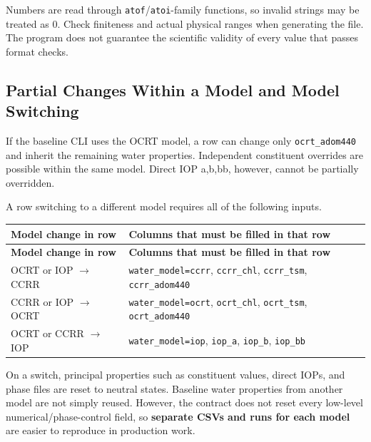 Numbers are read through \texttt{atof}/\texttt{atoi}-family functions, so invalid strings may be treated as 0. Check finiteness and actual physical ranges when generating the file. The program does not guarantee the scientific validity of every value that passes format checks.

\subsection{Partial Changes Within a Model and Model Switching}
\label{sec:auto:08_input_formats:2.3}
If the baseline CLI uses the OCRT model, a row can change only \texttt{ocrt\_\allowbreak{}adom440} and inherit the remaining water properties. Independent constituent overrides are possible within the same model. Direct IOP a,b,bb, however, cannot be partially overridden.

A row switching to a different model requires all of the following inputs.


{\TableFont
\begin{longtable}{@{}>{\raggedright\arraybackslash}p{}>{\raggedright\arraybackslash}p{}@{}}
\toprule
\textbf{Model change in row} & \textbf{Columns that must be filled in that row} \\
\midrule
\endfirsthead
\toprule
\textbf{Model change in row} & \textbf{Columns that must be filled in that row} \\
\midrule
\endhead
\bottomrule
\endfoot
OCRT or IOP \ensuremath{\rightarrow} CCRR & \texttt{water\_\allowbreak{}model=\allowbreak{}ccrr}, \texttt{ccrr\_\allowbreak{}chl}, \texttt{ccrr\_\allowbreak{}tsm}, \texttt{ccrr\_\allowbreak{}adom440} \\
CCRR or IOP \ensuremath{\rightarrow} OCRT & \texttt{water\_\allowbreak{}model=\allowbreak{}ocrt}, \texttt{ocrt\_\allowbreak{}chl}, \texttt{ocrt\_\allowbreak{}tsm}, \texttt{ocrt\_\allowbreak{}adom440} \\
OCRT or CCRR \ensuremath{\rightarrow} IOP & \texttt{water\_\allowbreak{}model=\allowbreak{}iop}, \texttt{iop\_\allowbreak{}a}, \texttt{iop\_\allowbreak{}b}, \texttt{iop\_\allowbreak{}bb} \\
\end{longtable}
}

On a switch, principal properties such as constituent values, direct IOPs, and phase files are reset to neutral states. Baseline water properties from another model are not simply reused. However, the contract does not reset every low-level numerical/phase-control field, so \textbf{separate CSVs and runs for each model} are easier to reproduce in production work.

